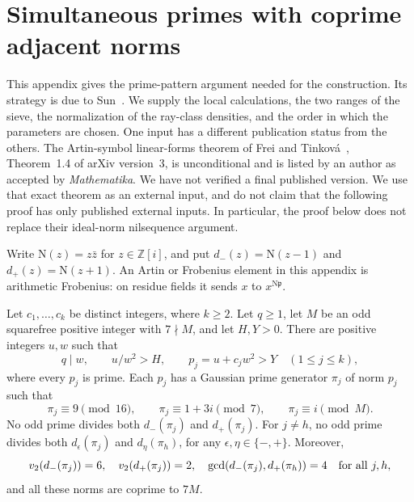 \section{Simultaneous primes with coprime adjacent norms}
\label{sec:v5-sun-proof}

This appendix gives the prime-pattern argument needed for the construction.
Its strategy is due to Sun~\cite{v5sun}. We supply the local calculations,
the two ranges of the sieve, the normalization of the ray-class densities,
and the order in which the parameters are chosen. One input has a different
publication status from the others. The Artin-symbol linear-forms theorem
of Frei and Tinkov\'a~\cite{v5ft}, Theorem~1.4 of arXiv version~3, is
unconditional and is listed by an author as accepted by \emph{Mathematika}.
We have not verified a final published version. We use that exact theorem
as an external input, and do not claim that the following proof has only
published external inputs. In particular, the proof below does not replace
their ideal-norm nilsequence argument.

Write $\mathrm N(z)=z\bar z$ for $z\in\mathbb Z[i]$, and put
$d_-(z)=\mathrm N(z-1)$ and $d_+(z)=\mathrm N(z+1)$.
An Artin or Frobenius element in this appendix is arithmetic Frobenius:
on residue fields it sends $x$ to $x^{\mathrm N\mathfrak p}$.

\begin{theorem}\label{thm:v5-simultaneous-primes}
Let $c_1,\ldots,c_k$ be distinct integers, where $k\geq2$.
Let $q\geq1$, let $M$ be an odd squarefree positive integer with $7\nmid M$,
and let $H,Y>0$. There are positive integers $u,w$ such that
\[
 q\mid w,\qquad u/w^2>H,\qquad p_j=u+c_jw^2>Y
 \quad(1\leq j\leq k),
\]
where every $p_j$ is prime. Each $p_j$ has a Gaussian prime generator
$\pi_j$ of norm $p_j$ such that
\[
 \pi_j\equiv9\pmod {16},\qquad
 \pi_j\equiv1+3i\pmod7,\qquad
 \pi_j\equiv i\pmod M.
\]
No odd prime divides both $d_-(\pi_j)$ and $d_+(\pi_j)$.
For $j\ne h$, no odd prime divides both $d_\epsilon(\pi_j)$ and
$d_\eta(\pi_h)$, for any $\epsilon,\eta\in\{-,+\}$.
Moreover,
\[
 v_2(d_-(\pi_j))=6,\quad v_2(d_+(\pi_j))=2,\quad
 \gcd(d_-(\pi_j),d_+(\pi_h))=4\quad\hbox{for all }j,h,
\]
and all these norms are coprime to $7M$.
\end{theorem}

